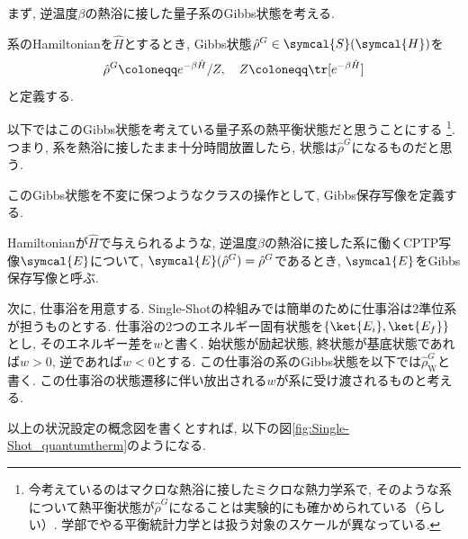 
まず, 逆温度$\beta$の熱浴に接した量子系のGibbs状態を考える. 
\begin{mydfn}[Gibbs状態]
  系のHamiltonianを$\hat{H}$とするとき, Gibbs状態$\hat{\rho}^G\in\symcal{S}(\symcal{H})$を
  \begin{equation}
    \hat{\rho}^G\coloneqq e^{-\beta\hat{H}}/Z, \quad  Z\coloneqq \tr[e^{-\beta\hat{H}}]
  \end{equation}
  と定義する. 
\end{mydfn}
以下ではこのGibbs状態を考えている量子系の熱平衡状態だと思うことにする
\footnote{今考えているのはマクロな熱浴に接したミクロな熱力学系で, そのような系について熱平衡状態が$\hat{\rho}^G$になることは実験的にも確かめられている（らしい）\cite{SagawaSaizensen}. 学部でやる平衡統計力学とは扱う対象のスケールが異なっている. }. 
つまり, 系を熱浴に接したまま十分時間放置したら, 状態は$\hat{\rho}^{G}$になるものだと思う.  

このGibbs状態を不変に保つようなクラスの操作として, Gibbs保存写像を定義する. 
\begin{mydfn}[Gibbs保存写像]
  Hamiltonianが$\hat{H}$で与えられるような, 逆温度$\beta$の熱浴に接した系に働くCPTP写像$\symcal{E}$について, $\symcal{E}(\hat{\rho}^G)=\hat{\rho}^G$であるとき, $\symcal{E}$をGibbs保存写像と呼ぶ. 
\end{mydfn}

次に, 仕事浴を用意する. 
Single-Shotの枠組みでは簡単のために仕事浴は2準位系が担うものとする. 
仕事浴の2つのエネルギー固有状態を$\{\ket{E_i}, \ket{E_f}\}$とし, そのエネルギー差を$w$と書く. 
始状態が励起状態, 終状態が基底状態であれば$w>0$, 逆であれば$w<0$とする. 
この仕事浴の系のGibbs状態を以下では$\hat{\rho}_{\text{W}}^{G}$と書く. 
この仕事浴の状態遷移に伴い放出される$w$が系に受け渡されるものと考える. 

以上の状況設定の概念図を書くとすれば, 以下の図\ref{fig:Single-Shot_quantumtherm}のようになる. 


